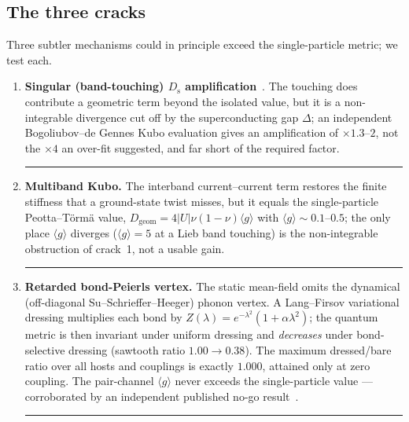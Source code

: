 \documentclass[11pt,a4paper]{article}
\newcommand{\tierdisc}[1]{\textcolor{#1}{\rule[0.05ex]{1.0ex}{1.0ex}}}
\newcommand{\tierRed}{\tierdisc{red!80!black}}     %
\newcommand{\qgg}{\langle g \rangle}
\newcommand{\Ds}{D_{\mathrm{s}}}
\begin{document}
\subsection{The three cracks}
Three subtler mechanisms could in principle exceed the single-particle metric; we test each.
\begin{enumerate}
\item \textbf{Singular (band-touching) $\Ds$ amplification}~\citep{jiang2024}. The touching does
contribute a geometric term beyond the isolated value, but it is a non-integrable divergence cut
off by the superconducting gap $\Delta$; an independent Bogoliubov--de Gennes Kubo evaluation gives
an amplification of $\times 1.3$--$2$, not the $\times 4$ an over-fit suggested, and far short of
the required factor. \tierRed{}
\item \textbf{Multiband Kubo.} The interband current--current term restores the finite stiffness
that a ground-state twist misses, but it equals the single-particle Peotta--T\"orm\"a value,
$D_{\mathrm{geom}} = 4|U|\nu(1-\nu)\qgg$ with $\qgg \sim 0.1$--$0.5$; the only place $\qgg$ diverges
($\qgg=5$ at a Lieb band touching) is the non-integrable obstruction of crack~1, not a usable gain.
\tierRed{}
\item \textbf{Retarded bond-Peierls vertex.} The static mean-field omits the dynamical
(off-diagonal Su--Schrieffer--Heeger) phonon vertex. A Lang--Firsov variational dressing multiplies
each bond by $Z(\lambda)=e^{-\lambda^2}(1+\alpha\lambda^2)$; the quantum metric is then invariant
under uniform dressing and \emph{decreases} under bond-selective dressing (sawtooth ratio
$1.00\to0.38$). The maximum dressed/bare ratio over all hosts and couplings is exactly $1.000$,
attained only at zero coupling. The pair-channel $\qgg$ never exceeds the single-particle value ---
corroborated by an independent published no-go result~\citep{nogo2026}. \tierRed{}
\end{enumerate}
\end{document}
